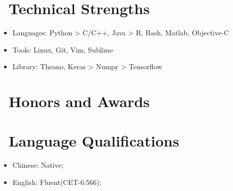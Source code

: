 \documentclass{resume}
\begin{document}

\section{\faCogs\ Technical Strengths}
\begin{itemize}[parsep=0.5ex]
  \item Languages: Python > C/C++, Java > R, Bash, Matlab, Objective-C
  \item Tools: Linux, Git, Vim, Sublime
  \item Library: Theano, Keras > Numpy > Tensorflow
\end{itemize}

\section{\faHeartO\ Honors and Awards}

\section{\faInfo\ Language Qualifications}
\begin{itemize}[parsep=0.5ex]
  \item Chinese: Native;
  \item English: Fluent(CET-6:566);
\end{itemize}

%
%
\end{document}
